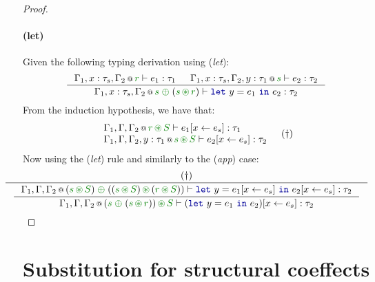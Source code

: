 \begin{proof}
\paragraph{(let)} Given the following typing derivation using (\emph{let}):
\[
\inference
  { \coctx{\Gamma_1,x:\tau_s,\Gamma_2}{\cclrd{r}} \vdash e_1 : \tau_1 &
    \coctx{\Gamma_1,x:\tau_s,\Gamma_2, y:\tau_1}{\cclrd{s}} \vdash e_2 : \tau_2}
  {\coctx{\Gamma_1,x:\tau_s,\Gamma_2}{\cclrd{s} \;\cpar\; (\cclrd{s} \,\cseq\, \cclrd{r})} \vdash \kvd{let}~y=e_1~\kvd{in}~e_2 : \tau_2 }
\]
From the induction hypothesis, we have that:
\[
\begin{array}{l}
 \coctx{\Gamma_1, \Gamma, \Gamma_2}{\cclrd{r}\,\cseq\,\cclrd{S}} \vdash \subst{e_1}{x}{e_s} : \tau_1 \\
 \coctx{\Gamma_1, \Gamma, \Gamma_2, y:\tau_1}{\cclrd{s}\,\cseq\,\cclrd{S}} \vdash \subst{e_2}{x}{e_s} : \tau_2
\end{array}\quad(\dagger)
\]
Now using the (\emph{let}) rule and similarly to the (\emph{app}) case:
\[
\hspace{-2em}
\inference
 { (\dagger) }
 { \inference
   { \coctx{\Gamma_1, \Gamma, \Gamma_2}{(\cclrd{s}\,\cseq\,\cclrd{S}) \;\cpar\; ((\cclrd{s}\,\cseq\,\cclrd{S}) \,\cseq\, (\cclrd{r}\,\cseq\,\cclrd{S}))} 
         \vdash \kvd{let}~y=\subst{e_1}{x}{e_s}~\kvd{in}~\subst{e_2}{x}{e_s} : \tau_2 } 
   { \coctx{\Gamma_1, \Gamma, \Gamma_2}{(\cclrd{s} \;\cpar\; (\cclrd{s} \,\cseq\, \cclrd{r})) \,\cseq\, \cclrd{S}} 
         \vdash \subst{(\kvd{let}~y=e_1~\kvd{in}~e_2)}{x}{e_s} : \tau_2 } }
\]
\end{proof}
\newpage



%                                                                      
%


\section{Substitution for structural coeffects}
\label{sec:appendix-struct-cbn}

